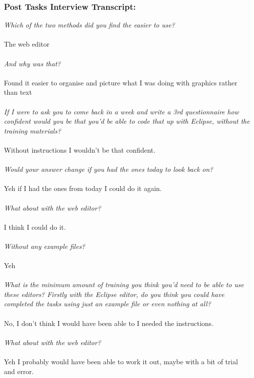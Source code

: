 \subsubsection*{Post Tasks Interview Transcript:}
\textit{Which of the two methods did you find the easier to use?}
\\
\\
The web editor
\\
\\
\textit{And why was that?}
\\
\\
Found it easier to organise and picture what I was doing with graphics rather than text
\\
\\
\textit{If I were to ask you to come back in a week and write a 3rd questionnaire how confident would you be that you'd be able to code that up with Eclipse, without the training materials?}
\\
\\
Without instructions I wouldn't be that confident.
\\
\\
\textit{Would your answer change if you had the ones today to look back on?}
\\
\\
Yeh if I had the ones from today I could do it again.\\
\\
\textit{What about with the web editor?}
\\
\\
I think I could do it.
\\
\\
\textit{Without any example files?}
\\
\\
Yeh
\\
\\
\textit{What is the minimum amount of training you think you'd need to be able to use these editors? Firstly with the Eclipse editor, do you think you could have completed the tasks using just an example file or even nothing at all?}
\\
\\
No, I don't think I would have been able to I needed the instructions.
\\
\\
\textit{What about with the web editor?}
\\
\\
Yeh I probably would have been able to work it out, maybe with a bit of trial and error.
